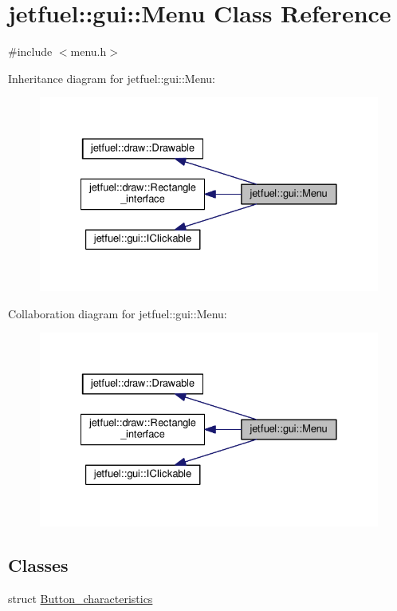 \hypertarget{classjetfuel_1_1gui_1_1Menu}{}\section{jetfuel\+:\+:gui\+:\+:Menu Class Reference}
\label{classjetfuel_1_1gui_1_1Menu}


{\ttfamily \#include $<$menu.\+h$>$}



Inheritance diagram for jetfuel\+:\+:gui\+:\+:Menu\+:\nopagebreak
\begin{figure}[H]
\begin{center}
\leavevmode
\includegraphics[width=328pt]{classjetfuel_1_1gui_1_1Menu__inherit__graph}
\end{center}
\end{figure}


Collaboration diagram for jetfuel\+:\+:gui\+:\+:Menu\+:\nopagebreak
\begin{figure}[H]
\begin{center}
\leavevmode
\includegraphics[width=328pt]{classjetfuel_1_1gui_1_1Menu__coll__graph}
\end{center}
\end{figure}
\subsection*{Classes}
\begin{DoxyCompactItemize}
\item 
struct \hyperlink{structjetfuel_1_1gui_1_1Menu_1_1Button__characteristics}{Button\+\_\+characteristics}
\end{DoxyCompactItemize}
